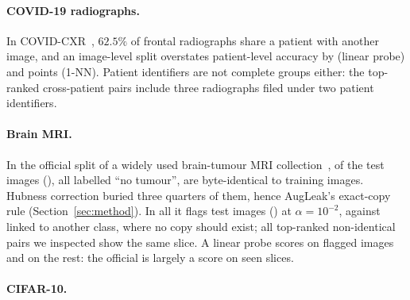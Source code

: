 \paragraph{COVID-19 radiographs.}
In COVID-CXR~\citep{cohen2020covid}, $62.5\%$ of frontal radiographs share a patient with another image, and an image-level split overstates patient-level accuracy by \numCovidLpGap{} (linear probe) and \numCovidKnnGap{} points (1-NN). Patient identifiers are not complete groups either: the top-ranked cross-patient pairs include three radiographs filed under two patient identifiers.

\paragraph{Brain MRI.}
In the official split of a widely used brain-tumour MRI collection~\citep{bhuvaji2020brain}, \numBTexact{} of the \numBTntest{} test images (\numBTexactPct{}), all labelled ``no tumour'', are byte-identical to training images. Hubness correction buried three quarters of them, hence AugLeak's exact-copy rule (Section~\ref{sec:method}). In all it flags \numBTflag{} test images (\numBTflagPct{}) at $\alpha=10^{-2}$, against \numBTcross{} linked to another class, where no copy should exist; all \numBTyes{} top-ranked non-identical pairs we inspected show the same slice. A linear probe scores \numBTaccFlag{} on flagged images and \numBTaccClean{} on the rest: the official \numBTaccAll{} is largely a score on seen slices.

\paragraph{CIFAR-10.}
\numCifarText{}
